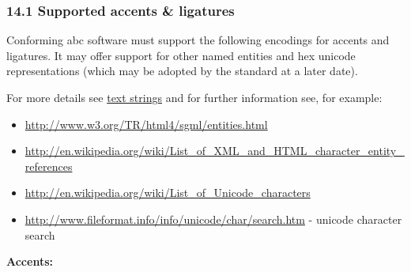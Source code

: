 \hypertarget{supported_accents_ligatures}{\subsubsection{14.1 Supported
accents \& ligatures}\label{supported_accents_ligatures}}

Conforming abc software must support the following encodings for accents
and ligatures. It may offer support for other named entities and hex
unicode representations (which may be adopted by the standard at a later
date).

For more details see \protect\hyperlink{text_strings}{text strings} and
for further information see, for example:

\begin{itemize}
\item
  \url{http://www.w3.org/TR/html4/sgml/entities.html}
\item
  \url{http://en.wikipedia.org/wiki/List_of_XML_and_HTML_character_entity_references}
\item
  \url{http://en.wikipedia.org/wiki/List_of_Unicode_characters}
\item
  \url{http://www.fileformat.info/info/unicode/char/search.htm} -
  unicode character search
\end{itemize}

\textbf{Accents:}

